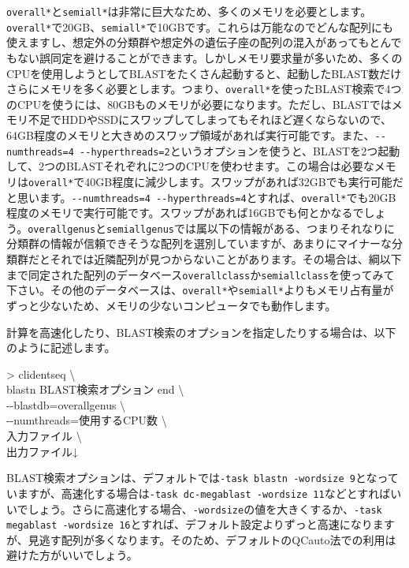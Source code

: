 \documentclass[titlepage,10pt,a4paper]{jsbook}
\newenvironment{cmd}{\begin{oframed}\raggedright\ttfamily\footnotesize\setlength{\baselineskip}{1.4em}}{\end{oframed}\vspace{-1em}}
\begin{document}
\texttt{overall{\textunderscore}*}と\texttt{semiall{\textunderscore}*}は非常に巨大なため、多くのメモリを必要とします。\texttt{overall{\textunderscore}*}で20GB、\texttt{semiall{\textunderscore}*}で10GBです。これらは万能なのでどんな配列にも使えますし、想定外の分類群や想定外の遺伝子座の配列の混入があってもとんでもない誤同定を避けることができます。しかしメモリ要求量が多いため、多くのCPUを使用しようとしてBLASTをたくさん起動すると、起動したBLAST数だけさらにメモリを多く必要とします。つまり、\texttt{overall{\textunderscore}*}を使ったBLAST検索で4つのCPUを使うには、80GBものメモリが必要になります。ただし、BLASTではメモリ不足でHDDやSSDにスワップしてしまってもそれほど遅くならないので、64GB程度のメモリと大きめのスワップ領域があれば実行可能です。また、\texttt{{-}{-}numthreads=4 {-}{-}hyperthreads=2}というオプションを使うと、BLASTを2つ起動して、2つのBLASTそれぞれに2つのCPUを使わせます。この場合は必要なメモリは\texttt{overall{\textunderscore}*}で40GB程度に減少します。スワップがあれば32GBでも実行可能だと思います。\texttt{{-}{-}numthreads=4 {-}{-}hyperthreads=4}とすれば、\texttt{overall{\textunderscore}*}でも20GB程度のメモリで実行可能です。スワップがあれば16GBでも何とかなるでしょう。\texttt{overall{\textunderscore}genus}と\texttt{semiall{\textunderscore}genus}では属以下の情報がある、つまりそれなりに分類群の情報が信頼できそうな配列を選別していますが、あまりにマイナーな分類群だとそれでは近隣配列が見つからないことがあります。その場合は、綱以下まで同定された配列のデータベース\texttt{overall{\textunderscore}class}か\texttt{semiall{\textunderscore}class}を使ってみて下さい。その他のデータベースは、\texttt{overall{\textunderscore}*}や\texttt{semiall{\textunderscore}*}よりもメモリ占有量がずっと少ないため、メモリの少ないコンピュータでも動作します。

計算を高速化したり、BLAST検索のオプションを指定したりする場合は、以下のように記述します。
\begin{cmd}
{\textgreater} clidentseq {\textbackslash}\\
blastn BLAST検索オプション end {\textbackslash}\\
{-}{-}blastdb=overall{\textunderscore}genus {\textbackslash}\\
{-}{-}numthreads=使用するCPU数 {\textbackslash}\\
入力ファイル {\textbackslash}\\
出力ファイル↓
\end{cmd}

BLAST検索オプションは、デフォルトでは\texttt{-task blastn -word{\textunderscore}size 9}となっていますが、高速化する場合は\texttt{-task dc-megablast -word{\textunderscore}size 11}などとすればいいでしょう。さらに高速化する場合、\texttt{-word{\textunderscore}size}の値を大きくするか、\texttt{-task megablast -word{\textunderscore}size 16}とすれば、デフォルト設定よりずっと高速になりますが、見逃す配列が多くなります。そのため、デフォルトのQCauto法での利用は避けた方がいいでしょう。
\end{document}
